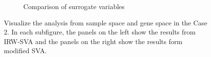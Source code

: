 \documentclass[11pt]{article}
\begin{document}
\begin{figure}[h!]
\begin{subfigure}[t]{0.4\textwidth}
    \caption{Comparison of surrogate variables}
    \label{fig:vector2}
    \end{subfigure}
    \caption{Visualize the analysis from sample space and gene space in the Case 2. In each subfigure, the panels on the left show the results from IRW-SVA and the panels on the right show the results form modified SVA.}
     \label{fig:visual2}
\end{figure}

\newpage
\clearpage



\end{document}
